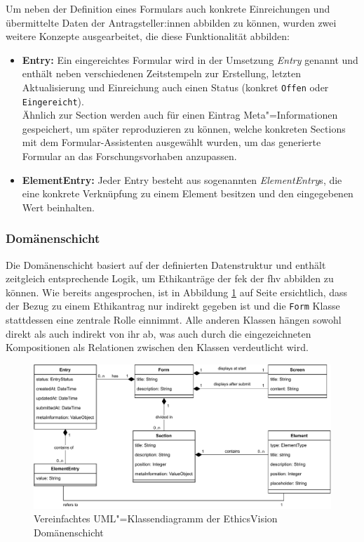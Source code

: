 \documentclass[a4paper,12pt,twoside]{scrreprt}
\begin{document}
Um neben der Definition eines Formulars auch konkrete Einreichungen und übermittelte Daten der Antragsteller:innen abbilden zu können, wurden zwei weitere Konzepte ausgearbeitet, die diese Funktionalität abbilden:
\begin{itemize}
    \item \textbf{Entry:} Ein eingereichtes Formular wird in der Umsetzung \textit{Entry} genannt und enthält neben verschiedenen Zeitstempeln zur Erstellung, letzten Aktualisierung und Einreichung auch einen Status (konkret \texttt{Offen} oder \texttt{Eingereicht}).\\
    Ähnlich zur Section werden auch für einen Eintrag Meta"=Informationen gespeichert, um später reproduzieren zu können, welche konkreten Sections mit dem Formular-Assistenten ausgewählt wurden, um das generierte Formular an das Forschungsvorhaben anzupassen.
    \item \textbf{ElementEntry:} Jeder Entry besteht aus sogenannten \textit{ElementEntry}s, die eine konkrete Verknüpfung zu einem Element besitzen und den eingegebenen Wert beinhalten.
\end{itemize}

\subsubsection*{Domänenschicht}
\label{sub-sub-sec:backend-domänenschicht}

Die Domänenschicht basiert auf der definierten Datenstruktur und enthält zeitgleich entsprechende Logik, um Ethikanträge der \acl{fek} der \acl{fhv} abbilden zu können. Wie bereits angesprochen, ist in Abbildung \ref{fig:ethics-vision-uml} auf Seite \pageref{fig:ethics-vision-uml} ersichtlich, dass der Bezug zu einem Ethikantrag nur indirekt gegeben ist und die \texttt{Form} Klasse stattdessen eine zentrale Rolle einnimmt. Alle anderen Klassen hängen sowohl direkt als auch indirekt von ihr ab, was auch durch die eingezeichneten Kompositionen als Relationen zwischen den Klassen verdeutlicht wird.

\begin{figure}[ht]
    \includegraphics[width=\linewidth]{thesis/images/Luidold_EthicsVision-Klassendiagramm.pdf}
    \caption{Vereinfachtes UML"=Klassendiagramm der EthicsVision Domänenschicht}
    \label{fig:ethics-vision-uml}
\end{figure}
\end{document}
